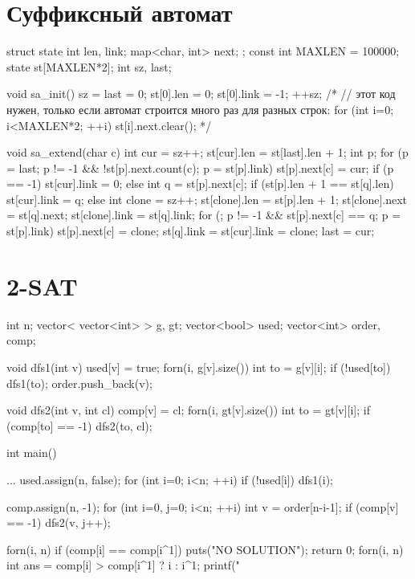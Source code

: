 \documentclass[12pt, titlepage]{article}
\begin{document}
\section{Суффиксный автомат}
\begin{cppcode}
struct state {
    int len, link;
    map<char, int> next;
};
const int MAXLEN = 100000;
state st[MAXLEN*2];
int sz, last;

void sa_init() {
    sz = last = 0;
    st[0].len = 0;
    st[0].link = -1;
    ++sz;
    /*
    // этот код нужен, только если автомат строится много раз для разных строк:
    for (int i=0; i<MAXLEN*2; ++i)
        st[i].next.clear();
    */
}

void sa_extend(char c) {
    int cur = sz++;
    st[cur].len = st[last].len + 1;
    int p;
    for (p = last; p != -1 && !st[p].next.count(c); p = st[p].link)
        st[p].next[c] = cur;
    if (p == -1)
        st[cur].link = 0;
    else {
        int q = st[p].next[c];
        if (st[p].len + 1 == st[q].len)
            st[cur].link = q;
        else {
            int clone = sz++;
            st[clone].len = st[p].len + 1;
            st[clone].next = st[q].next;
            st[clone].link = st[q].link;
            for (; p != -1 && st[p].next[c] == q; p = st[p].link)
                st[p].next[c] = clone;
            st[q].link = st[cur].link = clone;
        }
    }
    last = cur;
}
\end{cppcode}

\section{2-SAT}
\begin{cppcode}
int n;
vector< vector<int> > g, gt;
vector<bool> used;
vector<int> order, comp;

void dfs1(int v) {
    used[v] = true;
    forn(i, g[v].size()) {
        int to = g[v][i];
        if (!used[to])
            dfs1(to);
    }
    order.push_back(v);
}

void dfs2(int v, int cl) {
    comp[v] = cl;
    forn(i, gt[v].size()) {
        int to = gt[v][i];
        if (comp[to] == -1)
            dfs2(to, cl);
    }
}

int main() {
    ...
    used.assign(n, false);
    for (int i=0; i<n; ++i)
        if (!used[i])
            dfs1(i);

    comp.assign(n, -1);
    for (int i=0, j=0; i<n; ++i) {
        int v = order[n-i-1];
        if (comp[v] == -1)
            dfs2(v, j++);
    }

    forn(i, n)
        if (comp[i] == comp[i^1]) {
            puts("NO SOLUTION");
            return 0;
        }
    forn(i, n) {
        int ans = comp[i] > comp[i^1] ? i : i^1;
        printf("%
    }
}
\end{cppcode}
\end{document}
